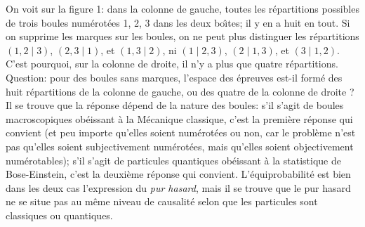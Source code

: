 On voit sur la figure 1: dans la colonne de gauche, toutes les 
r\'epartitions possibles de trois boules num\'erot\'ees 1, 2, 3 dans les  
deux bo\^\i tes; il y en a huit en tout. Si on supprime les marques sur les 
boules, on ne peut plus distinguer les r\'epartitions $(1,2 \mid 3)$, 
$(2,3 \mid 1)$, et $(1,3 \mid 2)$, ni $(1 \mid 2,3)$, $(2 \mid 1,3)$, et 
$(3 \mid 1,2)$. C'est pourquoi, sur la colonne de droite, il n'y a plus que 
quatre r\'epartitions.  
\medskip 
Question: pour des boules sans marques, l'espace des \'epreuves est-il 
form\'e des huit r\'epartitions de la colonne de gauche, ou des quatre de 
la colonne de droite ?   
\medskip 
Il se trouve que la r\'eponse d\'epend de la nature des boules: s'il s'agit 
de boules macroscopiques ob\'eissant \`a la M\'ecanique classique, 
c'est la premi\`ere r\'eponse qui convient (et peu importe  qu'elles 
soient num\'erot\'ees ou non, car le probl\`eme n'est pas qu'elles soient 
subjectivement num\'erot\'ees, mais qu'elles soient objectivement 
num\'erotables); s'il s'agit de particules quantiques ob\'eissant \`a la 
statistique de Bose-Einstein, c'est la deuxi\`eme r\'eponse qui convient.  
L'\'equiprobabilit\'e est bien dans les deux cas l'expression du {\it pur 
hasard}, mais il se trouve que le pur hasard ne se situe pas au m\^eme 
niveau  de causalit\'e selon que les particules sont classiques ou  
quantiques.   
\medskip 
 
